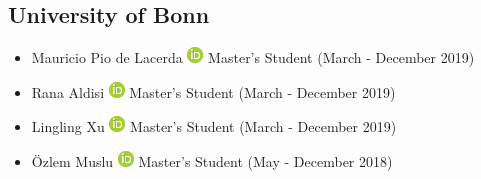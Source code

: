 \documentclass[10pt,a4paper,sans]{moderncv} %
\begin{document}
    \subsection{University of Bonn}
        \begin{itemize}
        \item     Mauricio Pio de Lacerda {\scriptsize     \href{https://orcid.org/0000-0002-1770-3007}{\includegraphics[scale=0.5]{img/ORCIDiD_icon16x16}}
}    Master's Student (March - December 2019)

        \item     Rana Aldisi {\scriptsize     \href{https://orcid.org/0000-0002-3034-9970}{\includegraphics[scale=0.5]{img/ORCIDiD_icon16x16}}
}    Master's Student (March - December 2019)

        \item     Lingling Xu {\scriptsize     \href{https://orcid.org/0000-0002-0303-8616}{\includegraphics[scale=0.5]{img/ORCIDiD_icon16x16}}
}    Master's Student (March - December 2019)

        \item     Özlem Muslu {\scriptsize     \href{https://orcid.org/0000-0003-0408-6190}{\includegraphics[scale=0.5]{img/ORCIDiD_icon16x16}}
}    Master's Student (May - December 2018)

        \end{itemize}
\end{document}
